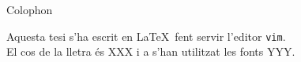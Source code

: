 \documentclass[10pt,b5paper,twoside,showtrims,openright]{memoir}
\begin{document}
\tableofcontents %


\mainmatter





\backmatter

%
%

\clearpage


\pagestyle{empty}
\null\vfil

\begin{center}
{\Large Colophon}
\end{center}
\begin{center}
	Aquesta tesi s'ha escrit en \LaTeX\ fent servir l'editor
        \texttt{vim}.\\
	El cos de la lletra és XXX i a s'han utilitzat les fonts
	YYY.
\end{center}
\vfil
\end{document}
